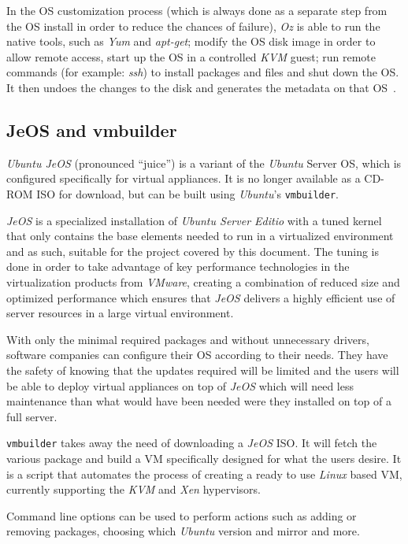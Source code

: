 In the OS customization process (which is always done as a separate step from the OS install in order to reduce the chances of failure), \textit{Oz} is able to run the native tools, such as \textit{Yum} and \textit{apt-get}; modify the OS disk image in order to allow remote access, start up the OS in a controlled \textit{KVM} guest; run remote commands (for example: \textit{ssh}) to install packages and files and shut down the OS. It then undoes the changes to the disk and generates the metadata on that OS~\cite{oz}.

\subsection{JeOS and vmbuilder}\label{subsec:vmbuilder}

\textit{Ubuntu JeOS} (pronounced ``juice'') is a variant of the \textit{Ubuntu} Server OS, which is configured specifically for virtual appliances. It is no longer available as a CD-ROM ISO for download, but can be built using \textit{Ubuntu}'s \texttt{vmbuilder}. 

\textit{JeOS} is a specialized installation of \textit{Ubuntu Server Editio} with a tuned kernel that only contains the base elements needed to run in a virtualized environment and as such, suitable for the project covered by this document. The tuning is done in order to take advantage of key performance technologies in the virtualization products from \textit{VMware}, creating a combination of reduced size and optimized performance which ensures that \textit{JeOS} delivers a highly efficient use of server resources in a large virtual environment.

With only the minimal required packages and without unnecessary drivers, software companies can configure their OS according to their needs. They have the safety of knowing that the updates required will be limited and the users will be able to deploy virtual appliances on top of \textit{JeOS} which will need less maintenance than what would have been needed were they installed on top of a full server.

\texttt{vmbuilder} takes away the need of downloading a \textit{JeOS} ISO. It will fetch the various package and build a VM specifically designed for what the users desire. It is a script that automates the process of creating a ready to use \textit{Linux} based VM, currently supporting the \textit{KVM} and \textit{Xen} hypervisors.

Command line options can be used to perform actions such as adding or removing packages, choosing which \textit{Ubuntu} version and mirror and more.

